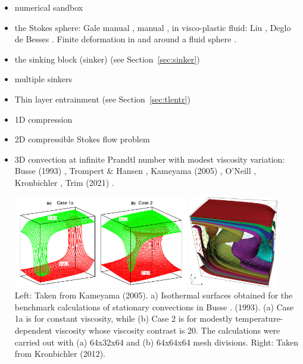 \begin{itemize}
\item numerical sandbox \cite{bube06,bube06,maie12,busa16,gltf18}
\item the Stokes sphere: Gale manual \cite{galemanual}, \aspect{} manual \cite{aspectmanual}, 
                         in visco-plastic fluid: Liu \etal \cite{limd02}, Deglo de Besses \etal \cite{demj04}. 
      Finite deformation in and around a fluid sphere \cite{sccm88,crud88}.
\item the sinking block (sinker) \cite{thie11,cehg14,gery10,geyu03,mamo08,mishin11,fumt11,maie12,sctc20} 
      (see Section~\ref{sec:sinker})
\item multiple sinkers \cite{mabl14,mabl15,clhe21}
\item Thin layer entrainment (see Section~\ref{sec:tlentr})
\item 1D compression \cite{modm02}
\item 2D compressible Stokes flow problem \cite{itki94,tagu07,lezh08,kilv10,lizh13}
\item 3D convection at infinite Prandtl number with modest viscosity variation:
      Busse \etal (1993) \cite{bucc93},
      Trompert \& Hansen \cite{trha98},
      Kameyama \etal (2005) \cite{kaks05},
      O'Neill \etal \cite{onmm06},
      Kronbichler \etal \cite{krhb12}, Trim \etal (2021) \cite{trbs21}.

      \begin{center}
      \includegraphics[height=4cm]{images/busse93/kaks05}
      \includegraphics[height=4cm]{images/busse93/krhb12}\\
      {\captionfont Left: Taken from Kameyama \etal (2005).
      a) Isothermal surfaces obtained for the benchmark calculations 
      of stationary convections in Busse \etal. (1993). (a) Case 1a is for
      constant viscosity, while (b) Case 2 is for modestly temperature-dependent 
      viscosity whose viscosity contrast is 20. The calculations
      were carried out with (a) 64x32x64 and (b) 64x64x64 mesh divisions.
      Right: Taken from Kronbichler \etal (2012).}
      \end{center}


\end{itemize}

